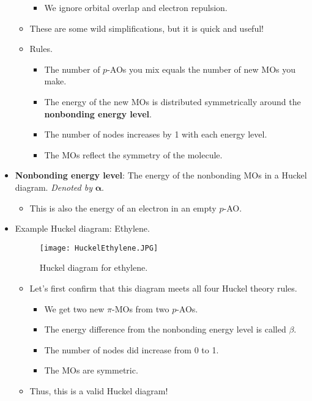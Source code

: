 \documentclass[../notes.tex]{subfiles}
\begin{document}
\begin{itemize}
\begin{itemize}
\begin{itemize}
            \item We ignore orbital overlap and electron repulsion.
        \end{itemize}
        \item These are some wild simplifications, but it is quick and useful!
        \item Rules.
        \begin{itemize}
            \item The number of $p$-AOs you mix equals the number of new MOs you make.
            \item The energy of the new MOs is distributed symmetrically around the \textbf{nonbonding energy level}.
            \item The number of nodes increases by 1 with each energy level.
            \item The MOs reflect the symmetry of the molecule.
        \end{itemize}
    \end{itemize}
    \item \textbf{Nonbonding energy level}: The energy of the nonbonding MOs in a Huckel diagram. \emph{Denoted by} $\bm{\alpha}$.
    \begin{itemize}
        \item This is also the energy of an electron in an empty $p$-AO.
    \end{itemize}
    \item Example Huckel diagram: Ethylene.
    \begin{figure}[h!]
        \centering
        \texttt{[image: HuckelEthylene.JPG]}
        \caption{Huckel diagram for ethylene.}
        \label{fig:HuckelEthylene}
    \end{figure}
    \begin{itemize}
        \item Let's first confirm that this diagram meets all four Huckel theory rules.
        \begin{itemize}
            \item We get two new $\pi$-MOs from two $p$-AOs.
            \item The energy difference from the nonbonding energy level is called $\beta$.
            \item The number of nodes did increase from 0 to 1.
            \item The MOs are symmetric.
        \end{itemize}
        \item Thus, this is a valid Huckel diagram!

\end{itemize}
\end{itemize}
\end{document}
